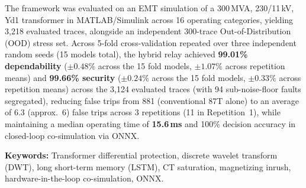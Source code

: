 \documentclass[12pt,a4paper,oneside]{report}
\begin{document}
{The framework was evaluated on an EMT simulation of a 300\,MVA, 230/11\,kV, Yd1 transformer in MATLAB/Simulink across 16 operating categories, yielding 3{,}218 evaluated traces, alongside an independent 300-trace Out-of-Distribution (OOD) stress set. Across 5-fold cross-validation repeated over three independent random seeds (15 models total), the hybrid relay achieved \textbf{99.01\% dependability} ($\pm0.48\%$ across the 15 fold models, $\pm1.07\%$ across repetition means) and \textbf{99.66\% security} ($\pm0.24\%$ across the 15 fold models, $\pm0.33\%$ across repetition means) across the 3{,}124 evaluated traces (with 94 sub-noise-floor faults segregated), reducing false trips from 881 (conventional 87T alone) to an average of 6.3 (approx.\ 6) false trips across 3 repetitions (11 in Repetition~1), while maintaining a median operating time of \textbf{15.6\,ms} and 100\% decision accuracy in closed-loop co-simulation via ONNX.

\vspace{0.2in}\par\noindent
\vspace{4pt}\par\noindent
\textbf{Keywords:} Transformer differential protection, discrete wavelet transform (DWT), long short-term memory (LSTM), CT saturation, magnetizing inrush, hardware-in-the-loop co-simulation, ONNX.\par}

\clearpage{}
{}
\tableofcontents

\clearpage{}
{}
\listoffigures

\clearpage{}
{}
\listoftables
\end{document}
